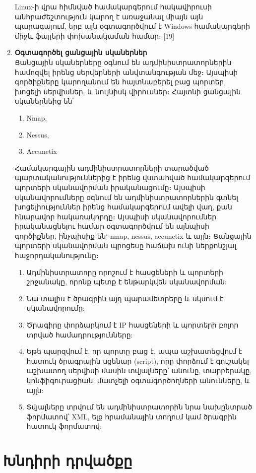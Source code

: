 \documentclass[a4paper,12pt]{article}
\begin{document}
\begin{sloppypar}
\begin{enumerate}
	Linux-ի վրա հիմնված համակարգերում հակավիրուսի անհրաժեշտություն կարող է
	առաջանալ միայն այն պարագայում, երբ այն օգտագործվում է Windows համակարգերի
	միջև ֆայլերի փոխանակաման համար։ [19]
\item \textbf{Օգտագործել ցանցային սկաներներ}\\
    Ցանցային սկաներները օգնում են ադմինիստրատորներին համոզվել իրենց
    սերվերների անվտանգության մեջ։ Այսպիսի գործիքները կարողանում են
    հայտնաբերել բաց պորտեր, խոցելի սերվիսներ, և նույնիսկ վիրուսներ։
    Հայտնի ցանցային սկաներնեից են՝
    \begin{enumerate}
        \item Nmap,
        \item Nessus,
        \item Accunetix
    \end{enumerate}
	Համակարգային ադմինիստրատորների տարածված պարտականություններից է իրենց
	վստահված համակարգերում պորտերի սկանավորման իրականացումը։
	Այսպիսի սկանավորումները օգնում են ադմինիստրատորներին գտնել խոցելիություններ
	իրենց համակարգերում ավելի վաղ, քան հնարավոր հակառակորդը։
	Այսպիսի սկանավորումներ իրականացնելու համար օգտագործվում են այնպիսի
	գործիքներ, ինչպիսիք են` nmap, nessus, accunetix և այլն։
	Ցանցային պորտերի սկանավորման պրոցեսը հաճախ ունի ներքոնշյալ հաջորդականությունը։

	\begin{enumerate}
	\item Ադմինիստրատորը որոշում է հասցեների և պորտերի շրջանակը, որոնք պետք է
		ենթարկվեն սկանավորման։
	\item Նա տալիս է ծրագրին այդ պարամետրերը և սկսում է սկանավորումը:
	\item Ծրագիրը փորձարկում է IP հասցեների և պորտերի բոլոր տրված
		համադրությունները:
	\item Եթե պարզվում է, որ պորտը բաց է, ապա աշխատեցվում է հատուկ ծրագրային
		սցենար (script), որը փորձում է գուշակել աշխատող սերվիսի մասին տվյալները՝
		անունը, տարբերակը, կոնֆիգուրացիան, մատչելի օգտագործողների անունները,
		և այլն:
	\item Տվյալները տրվում են ադմինիստրատորին նրա նախընտրած ֆորմատով՝
		XML, ելք հրամանային տողում կամ ծրագրին հատուկ ֆորմատով:
	\end{enumerate}
\end{enumerate}


\section{Խնդիրի դրվածքը}



\end{sloppypar}
\end{document}
